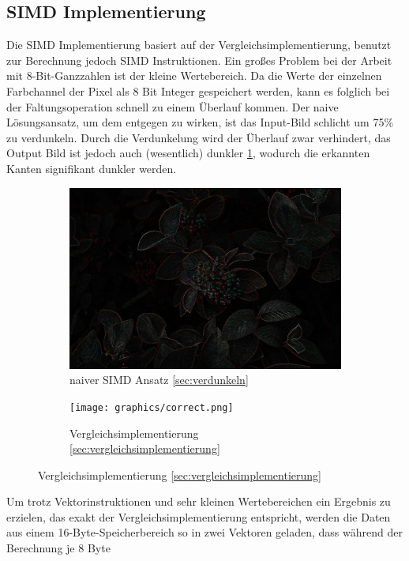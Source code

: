 \documentclass[course=erap]{aspdoc}
\begin{document}
\subsection{SIMD Implementierung}
\label{sec:simd-implementierung}
Die SIMD Implementierung basiert auf der Vergleichsimplementierung, benutzt zur Berechnung jedoch SIMD Instruktionen.
Ein großes Problem bei der Arbeit mit 8-Bit-Ganzzahlen ist der kleine Wertebereich.
Da die Werte der einzelnen Farbchannel der Pixel als 8 Bit Integer gespeichert werden, kann es folglich bei der Faltungsoperation schnell zu einem Überlauf kommen.
Der naive Lösungsansatz, um dem entgegen zu wirken, ist das Input-Bild schlicht um 75\% zu verdunkeln. \label{sec:verdunkeln}
Durch die Verdunkelung wird der Überlauf zwar verhindert, das Output Bild ist jedoch auch (wesentlich) dunkler {\ref{fig:dark}}, wodurch die erkannten Kanten signifikant dunkler werden.
\begin{figure}[H]
    \begin{subfigure}{.5\columnwidth}
        \centering
        \includegraphics[width=\columnwidth]{graphics/dark.png}
        \caption{naiver SIMD Ansatz \ref{sec:verdunkeln}}
        \label{fig:dark}
    \end{subfigure}
    \begin{subfigure}{.5\columnwidth}
        \centering
        \texttt{[image: graphics/correct.png]}
        \caption{Vergleichsimplementierung \ref{sec:vergleichsimplementierung}}
        \label{fig:correct}
    \end{subfigure}
\end{figure}
Um trotz Vektorinstruktionen und sehr kleinen Wertebereichen ein Ergebnis zu erzielen,
das exakt der Vergleichsimplementierung entspricht, werden die Daten aus einem 16-Byte-Speicherbereich so in zwei Vektoren geladen, dass während der Berechnung je 8 Byte
\end{document}
